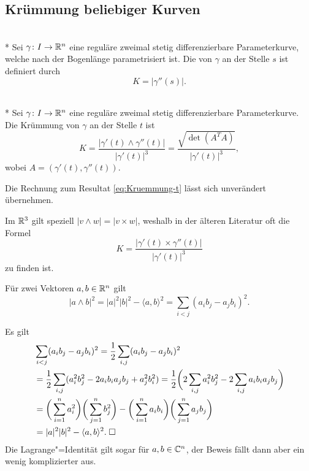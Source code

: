 \subsection{Krümmung beliebiger Kurven}

\begin{definition}\mbox{}\\*
Sei $\gamma\colon I\to \mathbb R^n$ eine reguläre zweimal stetig
differenzierbare Parameterkurve, welche nach der Bogenlänge
parametrisiert ist. Die  von $\gamma$ an der Stelle
$s$ ist definiert durch%
\begin{equation}
K = |\gamma''(s)|.
\end{equation}
\end{definition}

\begin{theorem}\mbox{}\\*
Sei $\gamma\colon I\to\mathbb R^n$ eine reguläre zweimal stetig
differenzierbare Parameterkurve. Die Krümmung von $\gamma$ an der
Stelle $t$ ist%
\begin{equation}
K = \frac{|\gamma'(t)\wedge\gamma''(t)|}{|\gamma'(t)|^3}
= \frac{\sqrt{\det(A^T A)}}{|\gamma'(t)|^3},
\end{equation}
wobei $A=(\gamma'(t),\gamma''(t))$.
\end{theorem}
 Die Rechnung zum Resultat \eqref{eq:Kruemmung-t}
lässt sich unverändert übernehmen.\;\qedsymbol

Im $\mathbb R^3$ gilt speziell $|v\wedge w| = |v\times w|$,
weshalb in der älteren Literatur oft die Formel%
\begin{equation}
K = \frac{|\gamma'(t)\times\gamma''(t)|}{|\gamma'(t)|^3}
\end{equation}
zu finden ist.

\begin{theorem}
Für zwei Vektoren $a,b\in\mathbb R^n$ gilt
\begin{equation}
|a\wedge b|^2 = |a|^2 |b|^2 - \langle a,b\rangle^2
= \sum_{i<j} (a_i b_j - a_j b_i)^2.
\end{equation}
\end{theorem}
Es gilt
\begin{align}
&\sum_{i<j} (a_i b_j - a_j b_i)^2
= \frac{1}{2}\sum_{i,j} (a_i b_j - a_j b_i)^2\\
&= \frac{1}{2}\sum_{i,j} (a_i^2 b_j^2 - 2a_i b_i a_j b_j + a_j^2 b_i^2)
= \frac{1}{2}\bigg(2\sum_{i,j} a_i^2 b_j^2 - 2\sum_{i,j}a_i b_i a_j b_j\bigg)\\
&= \bigg(\sum_{i=1}^n a_i^2\bigg)\bigg(\sum_{j=1}^n b_j^2\bigg)
- \bigg(\sum_{i=1}^n a_i b_i\bigg)\bigg(\sum_{j=1}^n a_j b_j\bigg)\\
&= |a|^2 |b|^2 - \langle a,b\rangle^2.\;\Box
\end{align}
Die Lagrange"=Identität gilt sogar für $a,b\in\mathbb C^n$, der Beweis
fällt dann aber ein wenig komplizierter aus.

